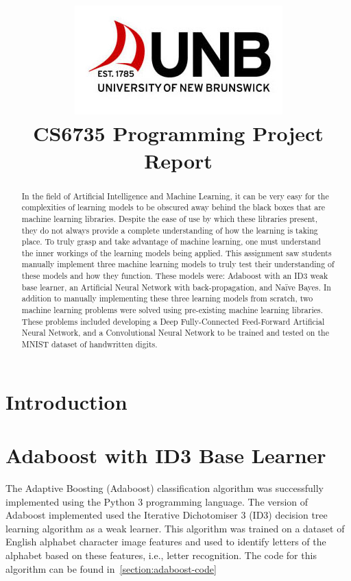 \documentclass[a4paper]{article}
\title{\includegraphics[scale=0.75]{images/unblogo.jpg}\\CS6735 Programming Project Report}
\begin{document}
\maketitle

\begin{abstract}
    In the field of Artificial Intelligence and Machine Learning, it can be very easy for the complexities of learning models to be obscured away behind the black boxes that are machine learning libraries. Despite the ease of use by which these libraries present, they do not always provide a complete understanding of how the learning is taking place. To truly grasp and take advantage of machine learning, one must understand the inner workings of the learning models being applied. This assignment saw students manually implement three machine learning models to truly test their understanding of these models and how they function. These models were: Adaboost with an ID3 weak base learner, an Artificial Neural Network with back-propagation, and Naïve Bayes. In addition to manually implementing these three learning models from scratch, two machine learning problems were solved using pre-existing machine learning libraries. These problems included developing a Deep Fully-Connected Feed-Forward Artificial Neural Network, and a Convolutional Neural Network to be trained and tested on the MNIST dataset of handwritten digits.
\end{abstract}

\newpage

\section{Introduction}

\section{Adaboost with ID3 Base Learner}
The Adaptive Boosting (Adaboost) classification algorithm was successfully implemented using the Python 3 programming language. The version of Adaboost implemented used the Iterative Dichotomiser 3 (ID3) decision tree learning algorithm as a weak learner. This algorithm was trained on a dataset of English alphabet character image features and used to identify letters of the alphabet based on these features, i.e., letter recognition. The code for this algorithm can be found in~\ref{section:adaboost-code}
\end{document}

